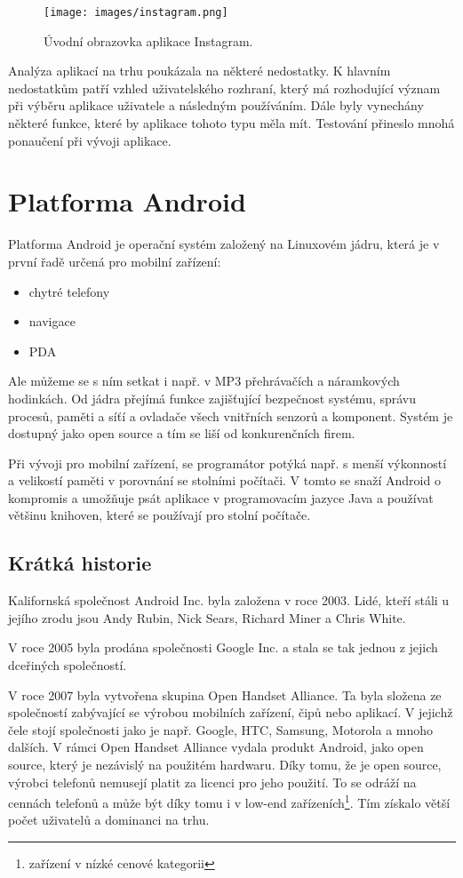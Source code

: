 \documentclass[12pt]{article}
\begin{document}
\begin{figure}[ht]
\centerline{\texttt{[image: images/instagram.png]}}
\caption{Úvodní obrazovka aplikace Instagram.} \label{insta}
\end{figure}
Analýza aplikací na trhu poukázala na některé nedostatky. K hlavním nedostatkům patří vzhled uživatelského rozhraní, který má rozhodující význam při výběru aplikace uživatele a následným používáním. Dále byly vynechány některé funkce, které by aplikace tohoto typu měla mít. Testování přineslo mnohá ponaučení při vývoji aplikace.
\newpage
\section{Platforma Android}
Platforma Android je operační systém založený na Linuxovém jádru, která je v první řadě určená pro mobilní zařízení:
\begin{itemize}
\item chytré telefony
\item navigace
\item PDA
\end{itemize}
Ale můžeme se s ním setkat i např. v MP3 přehrávačích a náramkových hodinkách.
Od jádra přejímá funkce zajišťující bezpečnost systému, správu procesů, paměti a síťí a ovladače všech vnitřních senzorů a komponent. Systém je dostupný jako open source a tím se  liší od konkurenčních firem.

Při vývoji pro mobilní zařízení, se programátor potýká např. s menší výkonností a velikostí paměti v porovnání se stolními počítači. V tomto se snaží Android o kompromis a umožňuje psát aplikace v programovacím jazyce Java a používat většinu knihoven, které se používají pro stolní počítače.
\subsection{Krátká historie}
Kalifornská společnost Android Inc. byla založena v roce 2003. Lidé, kteří stáli u jejího zrodu jsou Andy Rubin, Nick Sears, Richard Miner a Chris White.

V roce 2005 byla prodána společnosti Google Inc. a stala se tak jednou z jejich dceřiných společností.\cite{historie}

 V roce 2007 byla vytvořena skupina Open Handset Alliance. Ta byla složena ze společností zabývající se výrobou mobilních zařízení, čipů nebo aplikací. V jejichž čele stojí společnosti jako je např. Google, HTC, Samsung, Motorola a mnoho dalších. V rámci Open Handset Alliance vydala produkt Android, jako open source, který je nezávislý na použitém hardwaru. Díky tomu, že je open source, výrobci telefonů nemusejí platit za licenci pro jeho použití. To se odráží na cennách telefonů a může být díky tomu i v low-end zařízeních\footnote[1]{zařízení v nízké cenové kategorii}. Tím získalo větší počet uživatelů a dominanci na trhu.
 
\end{document}
